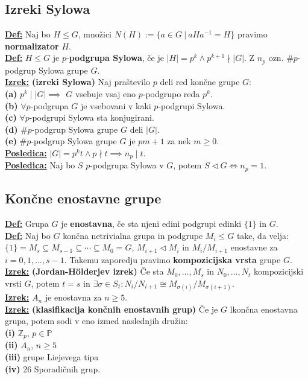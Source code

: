 \documentclass[a4paper,oneside,8pt,landscape]{extarticle}
\let\oldtextbf\textbf
\renewcommand{\textbf}[1]{\oldtextbf{\boldmath #1}}
\newcommand{\definicija}[1]{\textbf{\underline{Def:} }{#1}\\}
\newcommand{\posledica}[1]{\textbf{\underline{Posledica:} }{#1}\\}
\newcommand{\izrek}[1]{\textbf{\underline{Izrek:} }{#1}\\}
\newcommand{\bt}[1]{\textbf{#1}}
\begin{document}
\begin{multicols*}{3}
\subsection*{Izreki Sylowa}
\definicija{Naj bo $H\leq G$, množici $N(H) := \{a\in G\ | \ aHa^{-1} = H\}$ pravimo \bt{normalizator} $H$.}
\definicija{$H\leq G$ je $p$-\bt{podgrupa Sylowa}, če je $|H|=p^k \land p^{k+1} \nmid |G|$. Z $n_p$  ozn. $\# p$-podgrup Sylowa grupe $G$.}
\izrek{\bt{(izreki Sylowa)} Naj praštevilo $p$ deli red končne grupe $G$: \\
\bt{(a)} $p^k \mid |G| \implies $ $G$ vsebuje vsaj eno $p$-podgrupo reda $p^k$. \\
\bt{(b)} $\forall p$-podgrupa $G$ je vsebovani v kaki $p$-podgrupi Sylowa. \\
\bt{(c)} $\forall p$-podgrupi Sylowa sta konjugirani. \\
\bt{(d)} $\# p$-podgrup Sylowa grupe $G$ deli $|G|$. \\
\bt{(e)} $\#p$-podgrup Sylowa grupe $G$ je $pm+1$ za nek $m\geq 0$.}
\posledica{$|G|=p^kt \land p\nmid t \implies n_p \mid t$.}
\posledica{Naj bo $S$ $p$-podgrupa Sylowa v $G$, potem $S\triangleleft G \iff n_p=1$.}
\vspace{-15pt}
\subsection*{Končne enostavne grupe}
\definicija{Grupa $G$ je \bt{enostavna}, če sta njeni edini podgrupi edinki $\{1\}$ in $G$.}
\definicija{Naj bo $G$ končna netrivialna grupa in podgrupe $M_i\leq G$ take, da velja: $\{1\} = M_s \subseteq M_{s-1} \subseteq\cdots \subseteq M_0 =G$, $M_{i+1}\triangleleft M_i$ in $M_i/M_{i+1}$ enostavne za $i=0,1,\dots,s-1$. Takemu zaporedju pravimo \bt{kompozicijska vrsta} grupe $G$.}
\izrek{\bt{(Jordan-H\"olderjev izrek)} Če sta $M_0,\dots,M_s$ in $N_0, \dots, N_t$ kompozicijski vrsti $G$, potem $t=s$ in $\exists \sigma\in S_t: N_i/N_{i+1} \cong M_{\sigma(i)}/M_{\sigma(i+1)}$.}
\izrek{$A_n$ je enostavna za $n\geq 5$.}
\izrek{\bt{(klasifikacija končnih enostavnih grup)} Če je $G$ lkončna enostavna grupa, potem sodi v eno izmed naslednjih družin: \\
\bt{(i)} $\mathbb{Z}_p$, $p\in \mathbb{P}$ \\
\bt{(ii)} $A_n$, $n\geq 5$ \\
\bt{(iii)} grupe Liejevega tipa \\ 
\bt{(iv)} 26 Sporadičnih grup.}
\vspace{-15pt}

\end{multicols*}
\end{document}
